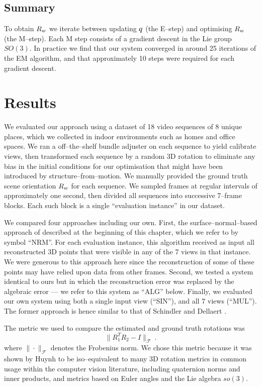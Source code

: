 \subsection{Summary}
To obtain $\SceneR$ we iterate between updating $\PosteriorEst$ (the
E--step) and optimising $\SceneR$ (the M--step). Each M step consists
of a gradient descent in the Lie group $SO(3)$. In practice we find
that our system converged in around 25 iterations of the EM algorithm,
and that approximately 10 steps were required for each gradient
descent.

\section{Results}

We evaluated our approach using a dataset of 18 video sequences of 8
unique places, which we collected in indoor environments such as homes
and office spaces. We ran a off--the--shelf bundle adjuster on each
sequence to yield calibrate views, then transformed each sequence by a
random 3D rotation to eliminate any bias in the initial conditions for
our optimisation that might have been introduced by
structure--from--motion. We manually provided the ground truth scene
orientation $\SceneR$ for each sequence. We sampled frames at regular
intervals of approximately one second, then divided all sequences into
successive 7--frame blocks. Each such block is a single ``evaluation
instance'' in our dataset.

We compared four approaches including our own. First, the
surface--normal--based approach of \cite{Furukawa09} described at the
beginning of this chapter, which we refer to by symbol ``NRM''. For
each evaluation instance, this algorithm received as input all
reconstructed 3D points that were visible in any of the 7 views in
that instance. We were generous to this approach here since the
reconstruction of some of these points may have relied upon data from
other frames. Second, we tested a system identical
to ours but in which the reconstruction error was replaced by the
algebraic error --- we refer to this system as ``ALG'' below. Finally, we
evaluated our own system using both a single input view (``SIN''), and
all 7 views (``MUL''). The former approach is hence similar to that of
Schindler and Dellaert \cite{Schindler2004}.

The metric we used to compare the estimated and ground truth
rotations was
\begin{equation}
  \| R_1^T R_2 - I \|_{\mathcal{F}} ~.
  \label{eq:rotation-metric}
\end{equation}
where $\|\cdot\|_{\mathcal{F}}$ denotes the Frobenius norm. We chose
this metric because it was shown by Huynh \cite{Huynh2009} to be
iso--equivalent to many 3D rotation metrics in common usage within
the computer vision literature, including quaternion norms and inner
products, and metrics based on Euler angles and the Lie algebra
$so(3)$.

